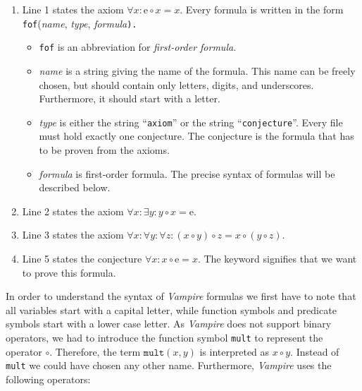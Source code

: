 \begin{enumerate}
\item Line 1 states the axiom $\forall x: \mathrm{e} \circ x = x$.  Every formula is written in the form
      \\[0.2cm]
      \hspace*{1.3cm}
      \texttt{fof}(\textsl{name}, \textsl{type}, \textsl{formula}\texttt{).}
      \begin{itemize}
      \item \texttt{fof} is an abbreviation for \textsl{first-order formula}. 
      \item \textsl{name} is a string giving the name of the formula.  This name can be freely chosen,
            but should contain only letters, digits, and underscores.  Furthermore, it should start with a letter.
      \item \textsl{type} is either the string ``\texttt{axiom}'' or the string ``\texttt{conjecture}''.
            Every file must hold exactly one conjecture.  The conjecture is the formula that has to be proven from the
            axioms.
      \item \textsl{formula} is first-order formula.  The precise syntax of formulas will be described below.
      \end{itemize}
\item Line 2 states the axiom $\forall x: \exists y: y \circ x = \mathrm{e}$.
\item Line 3 states the axiom $\forall x: \forall y: \forall z: (x \circ y) \circ z = x \circ (y \circ z)$.
\item Line 5 states the conjecture $\forall x: x \circ \mathrm{e} = x$.  The keyword 
      signifies that we want to prove this formula.  
\end{enumerate}
In order to understand the syntax of \textsl{Vampire} formulas we first have to note that all variables start
with a capital letter, while function symbols and predicate symbols start with a lower case letter.  As
\textsl{Vampire} does not support binary operators, we had to introduce the function symbol \texttt{mult} to
represent the operator $\circ$.  Therefore, the term $\mathtt{mult}(x, y)$ is interpreted as $x \circ y$.
Instead of \texttt{mult} we could have chosen any other name.  Furthermore, \textsl{Vampire} uses the following
operators:
